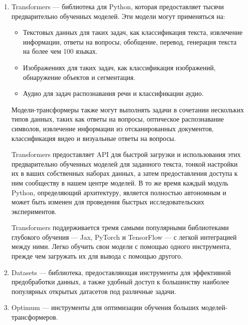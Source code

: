 \begin{enumerate}
	\item Transformers --- библиотека для Python, которая предоставляет тысячи предварительно обученных моделей. Эти модели могут применяться на:
	\begin{itemize}
		\item Текстовых данных для таких задач, как классификация текста, извлечение информации, ответы на вопросы, обобщение, перевод, генерация текста на более чем 100 языках.
		\item Изображениях для таких задач, как классификация изображений, обнаружение объектов и сегментация.
		\item Аудио для задач распознавания речи и классификации аудио.
	\end{itemize}

	Модели-трансформеры также могут выполнять задачи в сочетании нескольких типов данных, таких как ответы на вопросы, оптическое распознавание символов, извлечение информации из отсканированных документов, классификация видео и визуальные ответы на вопросы.
	
	Transformers предоставляет API для быстрой загрузки и использования этих предварительно обученных моделей для заданного текста, тонкой настройки их в ваших собственных наборах данных, а затем предоставления доступа к ним сообществу в нашем центре моделей. В то же время каждый модуль Python, определяющий архитектуру, является полностью автономным и может быть изменен для проведения быстрых исследовательских экспериментов.
	
	Transformers поддерживается тремя самыми популярными библиотеками глубокого обучения — Jax, PyTorch и TensorFlow --- с легкой интеграцией между ними. Легко обучить свои модели с помощью одного инструмента, прежде чем загружать их для вывода с помощью другого.
	
	\item Datasets --- библиотека, предоставляющая инструменты для эффективной предобработки данных, а также удобный доступ к большинству наиболее популярных открытых датасетов под различные задачи.
	
	\item Optimum --- инструменты для оптимизации обучения больших моделей-трансформеров.
\end{enumerate}